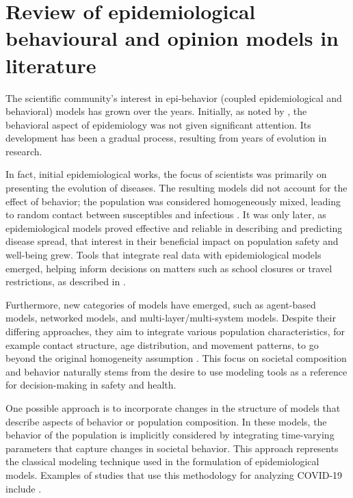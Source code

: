 
\chapter{Review of epidemiological behavioural and opinion models in literature}
\label{ch:literature_review}
The scientific community's interest in epi-behavior (coupled epidemiological and behavioral) models has grown over the years. Initially, as noted by \cite{Bauch_2012_overview}, the behavioral aspect of epidemiology was not given significant attention. Its development has been a gradual process, resulting from years of evolution in research.

In fact, initial epidemiological  works, the focus of scientists was primarily on presenting the evolution of diseases. The resulting models did not account for the effect of behavior; the population was considered homogeneously mixed, leading to random contact between susceptibles and infectious \cite{Hernandez_Vargas_2022, Mata2021}. 
It was only later, as epidemiological models proved effective and reliable in describing and predicting disease spread, that interest in their beneficial impact on population safety and well-being grew. Tools that integrate real data with epidemiological models emerged, helping inform decisions on matters such as school closures or travel restrictions, as described in \cite{Bauch_2012_overview}.

Furthermore, new categories of models have emerged, such as agent-based models, networked models, and multi-layer/multi-system models. Despite their differing approaches, they aim to integrate various population characteristics, for example contact structure, age distribution, and movement patterns, to go beyond the original homogeneity assumption \cite{brauer2012mathematical}.
This focus on societal composition and behavior naturally stems from the desire to use modeling tools as a reference for decision-making in safety and health. 

One possible approach is to incorporate changes in the structure of models that describe aspects of behavior or population composition. In these models, the behavior of the population is implicitly considered by integrating time-varying parameters that capture changes in societal behavior. This approach represents the classical modeling technique used in the formulation of epidemiological models. Examples of studies that use this methodology for analyzing COVID-19 include \cite{Giordano_2020, Dehning_2020, Proverbio_2021}.

